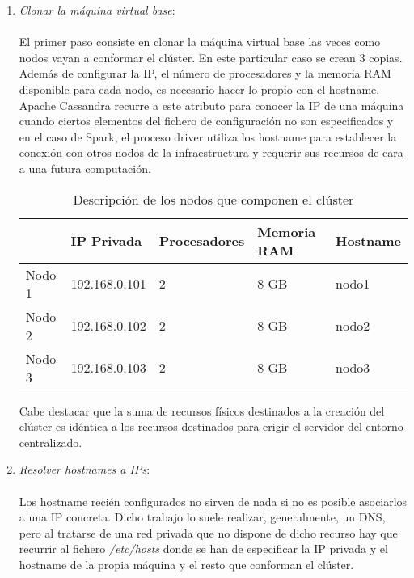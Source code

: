 \begin{enumerate}
	
\item \textit{Clonar la máquina virtual base}:\\\\El primer paso consiste en clonar la máquina virtual base las veces como nodos vayan a conformar el clúster. En este particular caso se crean 3 copias.\\

Además de configurar la IP, el número de procesadores y la memoria RAM disponible para cada nodo, es necesario hacer lo propio con el hostname. Apache Cassandra recurre a este atributo para conocer la IP de una máquina cuando ciertos elementos del fichero de configuración no son especificados y en el caso de Spark, el proceso driver utiliza los hostname para establecer la conexión con otros nodos de la infraestructura y requerir sus recursos de cara a una futura computación.\\

\begin{table}[h!]
	\centering
	\begin{tabular}{|l||l|l|l|l|}
		
		\hline
		
		& IP Privada & Procesadores & Memoria RAM & Hostname \\
		
		\hline
		\hline
		
		Nodo 1 & 192.168.0.101 & 2 & 8 GB & nodo1 \\
		
		\hline
		
		Nodo 2 & 192.168.0.102 & 2 & 8 GB & nodo2 \\
		
		\hline
		
		Nodo 3 & 192.168.0.103 & 2 & 8 GB & nodo3 \\
		
		\hline
		
	\end{tabular}
	\caption{Descripción de los nodos que componen el clúster}
	\label{nodos-cluster}
\end{table}

Cabe destacar que la suma de recursos físicos destinados a la creación del clúster es idéntica a los recursos destinados para erigir el servidor del entorno centralizado.\\ 

\item \textit{Resolver hostnames a IPs}:\\\\Los hostname recién configurados no sirven de nada si no es posible asociarlos a una IP concreta. Dicho trabajo lo suele realizar, generalmente, un DNS, pero al tratarse de una red privada que no dispone de dicho recurso hay que recurrir al fichero \textit{/etc/hosts} donde se han de especificar la IP privada y el hostname de la propia máquina y el resto que conforman el clúster.\\


\end{enumerate}
